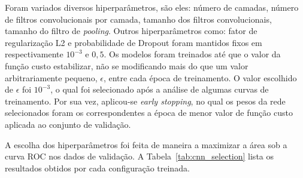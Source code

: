 Foram variados diversos hiperparâmetros, são eles: número de camadas, número de filtros convolucionais por camada,
tamanho dos filtros convolucionais, tamanho do filtro de \textit{pooling}.
Outros hiperparâmetros como: fator de regularização L2 e probabilidade de Dropout foram mantidos fixos em
respectivamente $10^{-3}$ e $0,5$.
Os modelos foram treinados até que o valor da função custo estabilizar, não se modificando mais do que um valor
arbitrariamente pequeno, $\epsilon$, entre cada época de treinamento.
O valor escolhido de $\epsilon$ foi $10^{-3}$, o qual foi selecionado após a análise de algumas curvas de treinamento.
Por sua vez, aplicou-se \textit{early stopping}, no qual os pesos da rede selecionados foram os correspondentes a época
de menor valor de função custo aplicada ao conjunto de validação.

A escolha dos hiperparâmetros foi feita de maneira a maximizar a área sob a curva ROC nos dados de validação.
A Tabela~\ref{tab:cnn_selection} lista os resultados obtidos por cada configuração treinada.


